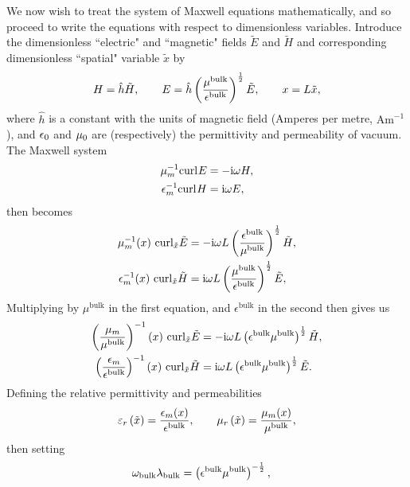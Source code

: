 We now wish to treat the system of Maxwell equations mathematically, and so proceed to write the equations with respect to dimensionless variables.
Introduce the dimensionless ``electric" and ``magnetic" fields $\tilde{E}$ and $\tilde{H}$ and corresponding dimensionless ``spatial" variable $\tilde{x}$ by
\begin{align*}
	H = \hat{h}\tilde{H}, 
	\qquad E = \hat{h}\left( \frac{\mu^{\mathrm{bulk}}}{\epsilon^{\mathrm{bulk}}} \right)^{\frac{1}{2}}\tilde{E},
	\qquad x = L\tilde{x},
\end{align*}
where $\hat{h}$ is a constant with the units of magnetic field (Amperes per metre, $\mathrm{A}\mathrm{m}^{-1}$), and $\epsilon_0$ and $\mu_0$ are (respectively) the permittivity and permeability of vacuum.
The Maxwell system
\begin{align*}
	\mu_m^{-1}\mathrm{curl}_{}E &= -\mathrm{i}\omega H, \\
	\epsilon_m^{-1}\mathrm{curl}_{}H &= \mathrm{i}\omega E,
\end{align*}
then becomes
\begin{align*}
	\mu_m^{-1}(x) \ \mathrm{curl}_{\tilde{x}}\tilde{E} 
	&= -\mathrm{i}\omega L\left( \frac{\epsilon^{\mathrm{bulk}}}{\mu^{\mathrm{bulk}}} \right)^{\frac{1}{2}} \tilde{H}, \\
	\epsilon_m^{-1}(x) \ \mathrm{curl}_{\tilde{x}}\tilde{H} 
	&= \mathrm{i}\omega L\left( \frac{\mu^{\mathrm{bulk}}}{\epsilon^{\mathrm{bulk}}} \right)^{\frac{1}{2}} \tilde{E},
\end{align*}
Multiplying by $\mu^{\mathrm{bulk}}$ in the first equation, and $\epsilon^{\mathrm{bulk}}$ in the second then gives us
\begin{align*}
	\bracs{\frac{\mu_m}{\mu^{\mathrm{bulk}}}}^{-1}(x) \ \curl{\tilde{x}}\tilde{E} 
	&= -\rmi\omega L\bracs{\epsilon^{\mathrm{bulk}}\mu^{\mathrm{bulk}}}^{\recip{2}} \tilde{H}, \\
	\bracs{\frac{\epsilon_m}{\epsilon^{\mathrm{bulk}}}}^{-1}(x) \ \curl{\tilde{x}}\tilde{H} 
	&= \rmi\omega L\bracs{\epsilon^{\mathrm{bulk}}\mu^{\mathrm{bulk}}}^{\recip{2}} \tilde{E}.
\end{align*}
Defining the relative permittivity and permeabilities
\begin{align*}
	\varepsilon_r\left( \tilde{x} \right) = \frac{\epsilon_m(x)}{\epsilon^{\mathrm{bulk}}},
	\qquad \mu_r\left( \tilde{x} \right) = \frac{\mu_m(x)}{\mu^{\mathrm{bulk}}},
\end{align*}
then setting
\begin{align*}
	\omega_{\mathrm{bulk}} \lambda_{\mathrm{bulk}}
	&= \left( \epsilon^{\mathrm{bulk}}\mu^{\mathrm{bulk}} \right)^{-\frac{1}{2}},
\end{align*}
